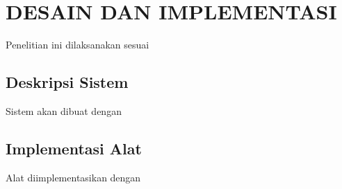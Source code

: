 \chapter{DESAIN DAN IMPLEMENTASI}
\label{chap:desainimplementasi}


Penelitian ini dilaksanakan sesuai \lipsum[1][1-5]

\section{Deskripsi Sistem}
\label{sec:deskripsisistem}

Sistem akan dibuat dengan \lipsum[1-2]

\section{Implementasi Alat
  \label{sec:implementasi alat}}

Alat diimplementasikan dengan \lipsum[1]






\lipsum[4]
